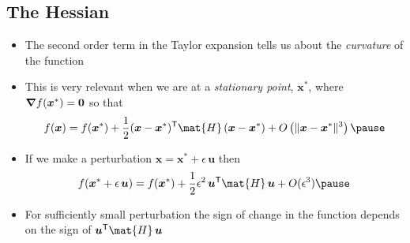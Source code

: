 \begin{slide}
\section[-2]{The Hessian}

\begin{PauseHighLight}
  \begin{itemize}
  \item The second order term in the Taylor expansion tells us about
    the \emph{curvature} of the function\pause
  \item This is very relevant when we are at a \emph{stationary point},
    $\bm{x}^*$, where $\bm{\nabla} f(\bm{x}^*) = \bm{0}$ so that
    \begin{align*}
      f(\bm{x}) = f(\bm{x}^*) + \frac{1}{2} (\bm{x} - \bm{x}^*)^\tr
      \mat{H}\, (\bm{x} - \bm{x}^*) + O\bra{\strut \|\bm{x} - \bm{x}^*\|^3}\pause
    \end{align*}
  \item If we make a perturbation $\bm{x} = \bm{x}^* + \epsilon\, \bm{u}$ then
    \begin{align*}
      f(\bm{x}^*+\epsilon\,\bm{u}) = f(\bm{x}^*) + \frac{1}{2} \epsilon^2\, \bm{u}^\tr
      \mat{H} \, \bm{u} + O(\epsilon^3)\pause
    \end{align*}
  \item For sufficiently small perturbation the sign of change in the function
    depends on the sign of $\bm{u}^\tr \mat{H} \, \bm{u}$\pause
  \end{itemize}
\end{PauseHighLight}

\end{slide}


